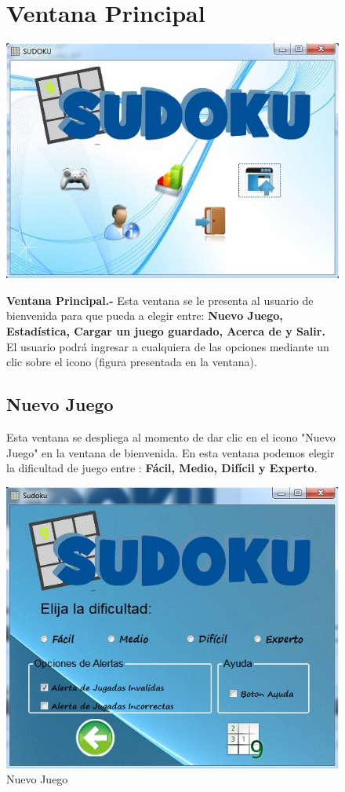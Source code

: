 \documentclass[12pt,oneside]{book}
\begin{document}
		\begin{figure}
			\section{Ventana Principal}
			\begin{center}
				\includegraphics[width=.60\textwidth]{./imagenes/ventanaPrincipal.jpg}
				\caption{Ventana Principal}
				\label{Ventana Principal}
			\end{center}
{\bf Ventana Principal.-} Esta ventana se le presenta al usuario de bienvenida para que pueda a elegir entre: {\bf Nuevo Juego, Estadística, Cargar un juego guardado,  Acerca de y Salir.} \newline El usuario podrá ingresar a cualquiera de las opciones mediante un clic sobre el icono (figura presentada en la ventana).
			\subsection{Nuevo Juego}
Esta ventana se despliega al momento de dar clic en el icono "Nuevo Juego" en la ventana de bienvenida. En esta ventana podemos elegir la dificultad de juego entre : {\bf Fácil, Medio, Difícil y Experto}.
			\begin{center} 
				\includegraphics[width=.60\textwidth]{./imagenes/nuevoJuego.jpg}
				\caption{Nuevo Juego}
				\label{Nuevo Juego}
			\end{center}
		\end{figure}
\end{document}
